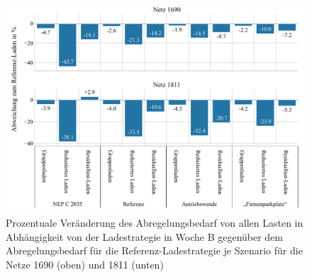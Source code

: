\begin{figure}[H]
    \centering
    \includegraphics[width=\textwidth]{Bilder/1690_1811_cur_load_grid_week_B}
    \caption{Prozentuale Veränderung des Abregelungsbedarf von allen Lasten in Abhängigkeit von der Ladestrategie in Woche B gegenüber dem Abregelungsbedarf für die Referenz-Ladestrategie je Szenario für die Netze \num{1690} (oben) und \num{1811} (unten)}\label{fig:1690_1811_cur_load_grid_week_B}
\end{figure}